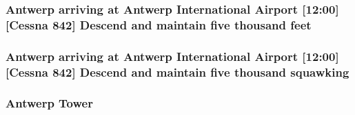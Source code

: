 \subsubsection[{\texorpdfstring{feet}{feet}}]{\setlength{\rightskip}{0pt plus 5cm}Antwerp arriving at Antwerp International {\bf Airport} \mbox{[}12\+:00\mbox{]}\mbox{[}{\bf Cessna} 842\mbox{]} Descend and maintain five {\bf thousand} feet}\hypertarget{test_2testOutput_2log_8txt_ab05f43b034caaa12636100a9769529ca}{}\label{test_2testOutput_2log_8txt_ab05f43b034caaa12636100a9769529ca}
\subsubsection[{\texorpdfstring{squawking}{squawking}}]{\setlength{\rightskip}{0pt plus 5cm}Antwerp arriving at Antwerp International {\bf Airport} \mbox{[}12\+:00\mbox{]}\mbox{[}{\bf Cessna} 842\mbox{]} Descend and maintain five {\bf thousand} squawking}\hypertarget{test_2testOutput_2log_8txt_a890147ec88e2d9518adf949981616843}{}\label{test_2testOutput_2log_8txt_a890147ec88e2d9518adf949981616843}
\subsubsection[{\texorpdfstring{Tower}{Tower}}]{\setlength{\rightskip}{0pt plus 5cm}Antwerp Tower}\hypertarget{test_2testOutput_2log_8txt_ade5c2a9317c664c53d015e41bdc32393}{}\label{test_2testOutput_2log_8txt_ade5c2a9317c664c53d015e41bdc32393}
